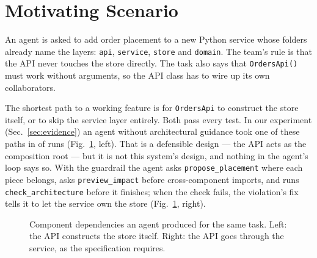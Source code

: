 \documentclass[10pt,conference]{IEEEtran}
\newcommand{\tool}[1]{\texttt{#1}}
\begin{document}
\section{Motivating Scenario}
\label{sec:motivation}
An agent is asked to add order placement to a new Python service whose folders
already name the layers: \tool{api}, \tool{service}, \tool{store} and
\tool{domain}. The team's rule is that the API never touches the store directly.
The task also says that \tool{OrdersApi()} must work without arguments, so the
API class has to wire up its own collaborators.

The shortest path to a working feature is for \tool{OrdersApi} to construct the
store itself, or to skip the service layer entirely. Both pass every test. In
our experiment (Sec.~\ref{sec:evidence}) an agent without architectural guidance
took one of these paths in \HaikuOffViol{} of \HaikuOffN{} runs (Fig.~\ref{fig:scenario},
left). That is a defensible design --- the API acts as the composition root ---
but it is not this system's design, and nothing in the agent's loop says so.
With the guardrail the agent asks \tool{propose\_placement} where each piece
belongs, asks \tool{preview\_impact} before cross-component imports, and runs
\tool{check\_architecture} before it finishes; when the check fails, the
violation's fix tells it to let the service own the store
(Fig.~\ref{fig:scenario}, right).

\begin{figure}[t]
  \centering
  \caption{Component dependencies an agent produced for the same task. Left:
  the API constructs the store itself. Right: the API goes through the
  service, as the specification requires.}
  \label{fig:scenario}
\end{figure}
\end{document}
